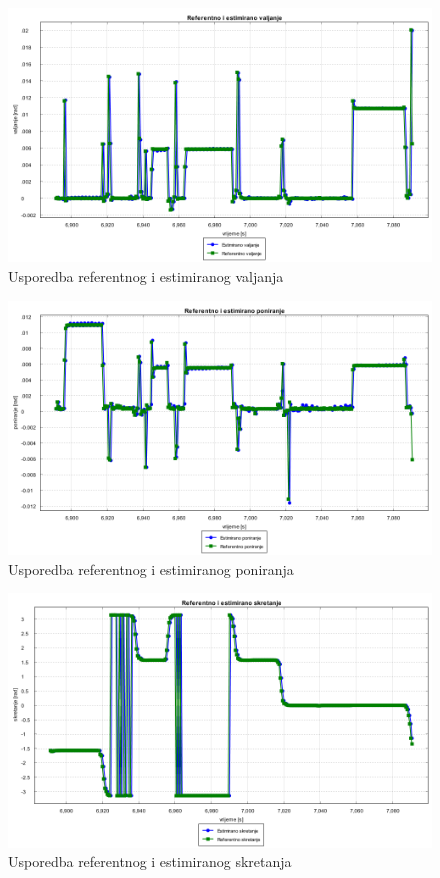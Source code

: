\begin{figure}[H]
  \includegraphics[scale=0.4]{images/voxel/pr3/referentno_estimirano_valjanje.png}
  \caption{Usporedba referentnog i estimiranog valjanja}
  \label{eval:a2p3_rot_roll}
\end{figure}
\begin{figure}[H]
  \includegraphics[scale=0.4]{images/voxel/pr3/referentno_estimirano_poniranje.png}
  \caption{Usporedba referentnog i estimiranog poniranja}
  \label{eval:a2p3_rot_pitch}
\end{figure}
\begin{figure}[H]
  \includegraphics[scale=0.4]{images/voxel/pr3/referentno_estimirano_skretanje.png}
  \caption{Usporedba referentnog i estimiranog skretanja}
  \label{eval:a2p3_rot_yaw}
\end{figure}


